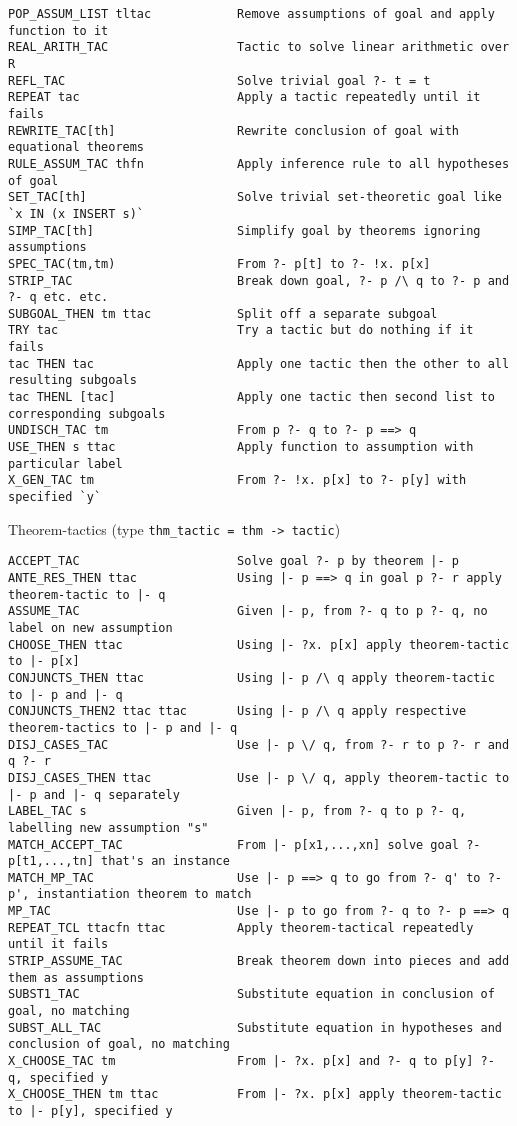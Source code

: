 \documentclass{llncs}
\begin{document}
\begin{verbatim}
POP_ASSUM_LIST tltac            Remove assumptions of goal and apply function to it
REAL_ARITH_TAC                  Tactic to solve linear arithmetic over R
REFL_TAC                        Solve trivial goal ?- t = t
REPEAT tac                      Apply a tactic repeatedly until it fails
REWRITE_TAC[th]                 Rewrite conclusion of goal with equational theorems
RULE_ASSUM_TAC thfn             Apply inference rule to all hypotheses of goal
SET_TAC[th]                     Solve trivial set-theoretic goal like `x IN (x INSERT s)`
SIMP_TAC[th]                    Simplify goal by theorems ignoring assumptions
SPEC_TAC(tm,tm)                 From ?- p[t] to ?- !x. p[x]
STRIP_TAC                       Break down goal, ?- p /\ q to ?- p and ?- q etc. etc.
SUBGOAL_THEN tm ttac            Split off a separate subgoal
TRY tac                         Try a tactic but do nothing if it fails
tac THEN tac                    Apply one tactic then the other to all resulting subgoals
tac THENL [tac]                 Apply one tactic then second list to corresponding subgoals
UNDISCH_TAC tm                  From p ?- q to ?- p ==> q
USE_THEN s ttac                 Apply function to assumption with particular label
X_GEN_TAC tm                    From ?- !x. p[x] to ?- p[y] with specified `y`
\end{verbatim}
\endgroup

{Theorem-tactics} (type \verb^thm_tactic = thm -> tactic^)

\begingroup
\scriptsize
\begin{verbatim}
ACCEPT_TAC                      Solve goal ?- p by theorem |- p
ANTE_RES_THEN ttac              Using |- p ==> q in goal p ?- r apply theorem-tactic to |- q
ASSUME_TAC                      Given |- p, from ?- q to p ?- q, no label on new assumption
CHOOSE_THEN ttac                Using |- ?x. p[x] apply theorem-tactic to |- p[x]
CONJUNCTS_THEN ttac             Using |- p /\ q apply theorem-tactic to |- p and |- q
CONJUNCTS_THEN2 ttac ttac       Using |- p /\ q apply respective theorem-tactics to |- p and |- q
DISJ_CASES_TAC                  Use |- p \/ q, from ?- r to p ?- r and q ?- r
DISJ_CASES_THEN ttac            Use |- p \/ q, apply theorem-tactic to |- p and |- q separately
LABEL_TAC s                     Given |- p, from ?- q to p ?- q, labelling new assumption "s"
MATCH_ACCEPT_TAC                From |- p[x1,...,xn] solve goal ?- p[t1,...,tn] that's an instance
MATCH_MP_TAC                    Use |- p ==> q to go from ?- q' to ?- p', instantiation theorem to match
MP_TAC                          Use |- p to go from ?- q to ?- p ==> q
REPEAT_TCL ttacfn ttac          Apply theorem-tactical repeatedly until it fails
STRIP_ASSUME_TAC                Break theorem down into pieces and add them as assumptions
SUBST1_TAC                      Substitute equation in conclusion of goal, no matching
SUBST_ALL_TAC                   Substitute equation in hypotheses and conclusion of goal, no matching
X_CHOOSE_TAC tm                 From |- ?x. p[x] and ?- q to p[y] ?- q, specified y
X_CHOOSE_THEN tm ttac           From |- ?x. p[x] apply theorem-tactic to |- p[y], specified y
\end{verbatim}
\endgroup
\end{document}
